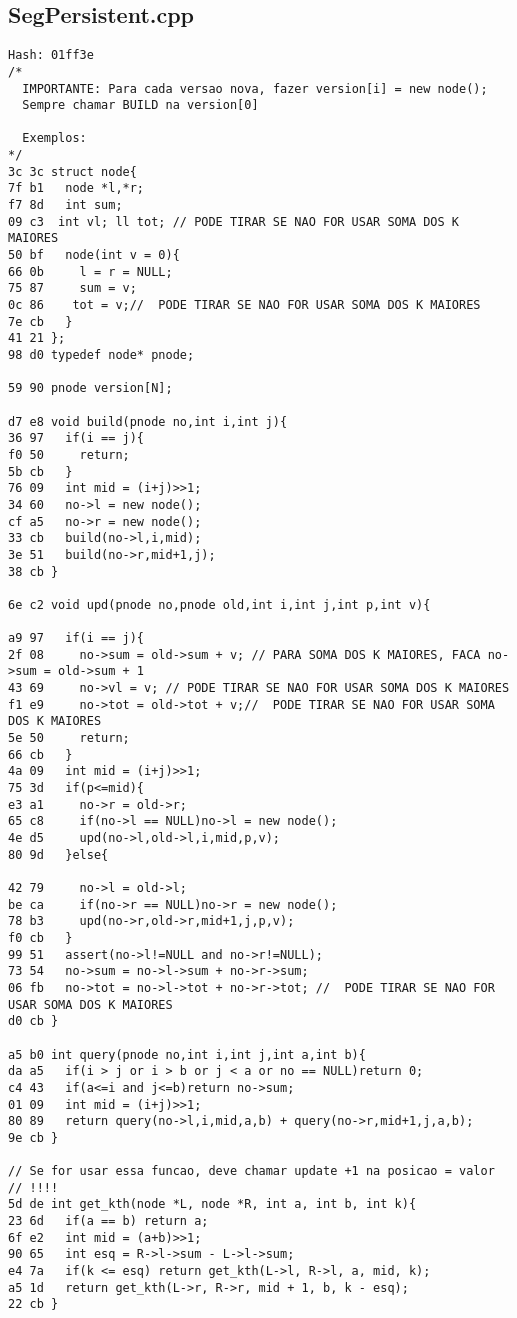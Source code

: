 \documentclass[11pt, a4paper, twoside]{article}
\begin{document}
\begin{lstlisting}
\end{lstlisting}

\subsection{SegPersistent.cpp}
\begin{lstlisting}
Hash: 01ff3e
/*
  IMPORTANTE: Para cada versao nova, fazer version[i] = new node();
  Sempre chamar BUILD na version[0]
  
  Exemplos:
*/
3c 3c struct node{
7f b1   node *l,*r;
f7 8d   int sum;
09 c3  int vl; ll tot; // PODE TIRAR SE NAO FOR USAR SOMA DOS K MAIORES 
50 bf   node(int v = 0){
66 0b     l = r = NULL;
75 87     sum = v;
0c 86    tot = v;//  PODE TIRAR SE NAO FOR USAR SOMA DOS K MAIORES 
7e cb   }
41 21 };
98 d0 typedef node* pnode;

59 90 pnode version[N];

d7 e8 void build(pnode no,int i,int j){
36 97   if(i == j){
f0 50     return;
5b cb   }
76 09   int mid = (i+j)>>1;
34 60   no->l = new node();
cf a5   no->r = new node();
33 cb   build(no->l,i,mid);
3e 51   build(no->r,mid+1,j);
38 cb }

6e c2 void upd(pnode no,pnode old,int i,int j,int p,int v){
      
a9 97   if(i == j){
2f 08     no->sum = old->sum + v; // PARA SOMA DOS K MAIORES, FACA no->sum = old->sum + 1
43 69     no->vl = v; // PODE TIRAR SE NAO FOR USAR SOMA DOS K MAIORES 
f1 e9     no->tot = old->tot + v;//  PODE TIRAR SE NAO FOR USAR SOMA DOS K MAIORES 
5e 50     return;
66 cb   }
4a 09   int mid = (i+j)>>1;
75 3d   if(p<=mid){
e3 a1     no->r = old->r;
65 c8     if(no->l == NULL)no->l = new node();
4e d5     upd(no->l,old->l,i,mid,p,v);
80 9d   }else{
      
42 79     no->l = old->l;
be ca     if(no->r == NULL)no->r = new node();
78 b3     upd(no->r,old->r,mid+1,j,p,v);
f0 cb   }
99 51   assert(no->l!=NULL and no->r!=NULL);
73 54   no->sum = no->l->sum + no->r->sum;
06 fb   no->tot = no->l->tot + no->r->tot; //  PODE TIRAR SE NAO FOR USAR SOMA DOS K MAIORES 
d0 cb }

a5 b0 int query(pnode no,int i,int j,int a,int b){
da a5   if(i > j or i > b or j < a or no == NULL)return 0;
c4 43   if(a<=i and j<=b)return no->sum;
01 09   int mid = (i+j)>>1;
80 89   return query(no->l,i,mid,a,b) + query(no->r,mid+1,j,a,b);
9e cb }

// Se for usar essa funcao, deve chamar update +1 na posicao = valor
// !!!!
5d de int get_kth(node *L, node *R, int a, int b, int k){
23 6d 	if(a == b) return a;
6f e2 	int mid = (a+b)>>1;
90 65 	int esq = R->l->sum - L->l->sum;
e4 7a 	if(k <= esq) return get_kth(L->l, R->l, a, mid, k);
a5 1d 	return get_kth(L->r, R->r, mid + 1, b, k - esq);
22 cb }



\end{lstlisting}
\end{document}
